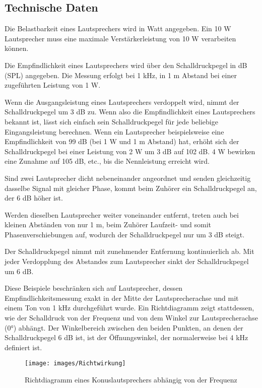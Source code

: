 \subsection{Technische Daten}
\label{sub:Technische Daten2}
\begin{compactenum}
\item Die Belastbarkeit eines Lautsprechers wird in Watt angegeben. Ein 10 W Lautsprecher muss eine maximale Verstärkerleistung von 10 W verarbeiten können.
\item Die Empfindlichkeit eines Lautsprechers wird über den Schalldruckpegel in dB (SPL) angegeben. Die Messung erfolgt bei 1 kHz, in 1 m Abstand bei einer zugeführten Leistung von 1 W.
\item Wenn die Ausgangsleistung eines Lautsprechers verdoppelt wird, nimmt der Schalldruckpegel um 3 dB zu. Wenn also die Empfindlichkeit eines Lautsprechers bekannt ist, lässt sich einfach sein Schalldruckpegel für jede beliebige Eingangsleistung berechnen. Wenn ein Lautsprecher beispielsweise eine Empfindlichkeit von 99 dB (bei 1 W und 1 m Abstand) hat, erhöht sich der Schalldruckpegel bei einer Leistung von 2 W um 3 dB auf 102 dB. 4 W bewirken eine Zunahme auf 105 dB, etc., bis die Nennleistung erreicht wird.
\item Sind zwei Lautsprecher dicht nebeneinander angeordnet und senden gleichzeitig dasselbe Signal mit gleicher Phase, kommt beim Zuhörer ein Schalldruckpegel an, der 6 dB höher ist.
\item Werden dieselben Lautsprecher weiter voneinander entfernt, treten auch bei kleinen Abständen von nur 1 m, beim Zuhörer Laufzeit- und somit Phasenverschiebungen auf, wodurch der Schalldruckpegel nur um 3 dB steigt.
\item Der Schalldruckpegel nimmt mit zunehmender Entfernung kontinuierlich ab. Mit jeder Verdopplung des Abstandes zum Lautsprecher sinkt der Schalldruckpegel um 6 dB.
\item Diese Beispiele beschränken sich auf Lautsprecher, dessen Empfindlichkeitsmessung exakt in der Mitte der Lautsprecherachse und mit einem Ton von 1 kHz durchgeführt wurde. Ein Richtdiagramm zeigt stattdessen, wie der Schalldruck von der Frequenz und von dem Winkel zur Lautsprecherachse (0°) abhängt. Der Winkelbereich zwischen den beiden Punkten, an denen der Schalldruckpegel 6 dB ist, ist der Öffnungswinkel, der normalerweise bei 4 kHz definiert ist.
\end{compactenum}

\begin{figure}[H]
\centering
\texttt{[image: images/Richtwirkung]}
\caption{Richtdiagramm eines Konuslautsprechers abhängig von der Frequenz}
\label{fig:richtdiagramm}
\end{figure}

